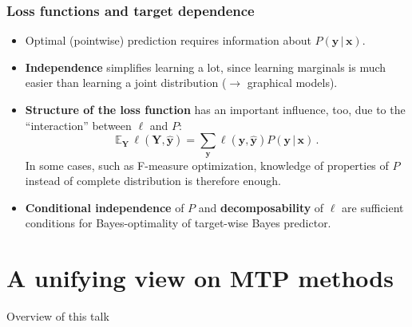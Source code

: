 \documentclass[]{beamer}
\renewcommand{\Pr}{P}
\newcommand{\bx}{\boldsymbol{x}}
\newcommand{\by}{\boldsymbol{y}}
\renewcommand{\emph}[1]{\textbf{\color{putblue}#1}}
\begin{document}
\begin{frame}
\frametitle{Loss functions and target dependence}
\begin{itemize}
\item Optimal (pointwise) prediction requires information about $\Pr( \by \, \vert \, \bx)$.
\pause

\item \emph{Independence} simplifies learning a lot, since learning marginals is much easier than learning a joint distribution ($\rightarrow$ graphical models).
\pause

\item \emph{Structure of the loss function} has an important influence, too, due to the ``interaction'' between $\ell$ and $\Pr$:
$$
\mathbb{E}_{\mathbf{Y}} \, \ell(\mathbf{Y}, \hat{\by}) =  \sum_{\by} \ell(\by, \hat{\by}) \Pr(\by \, \vert \, \bx) \, .
$$
In some cases, such as F-measure optimization, knowledge of properties of $\Pr$ instead of complete distribution is therefore enough. 
\pause

\item \emph{Conditional independence} of $\Pr$ and \emph{decomposability} of $\ell$ are sufficient conditions for Bayes-optimality of target-wise Bayes predictor.
\end{itemize}
\end{frame}





\section{A unifying view on MTP methods}


\begin{frame}{Overview of this talk}

\tableofcontents

\end{frame}
\end{document}
